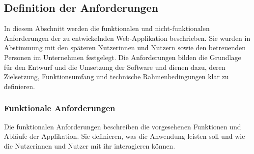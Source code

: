 \subsection{Definition der Anforderungen}
\label{sec:definition-der-anforderungen-und-ihre-interpretation}

In diesem Abschnitt werden die funktionalen und nicht-funktionalen Anforderungen der zu entwickelnden Web-Applikation beschrieben.
Sie wurden in Abstimmung mit den späteren Nutzerinnen und Nutzern sowie den betreuenden Personen im Unternehmen festgelegt.
Die Anforderungen bilden die Grundlage für den Entwurf und die Umsetzung der Software und dienen dazu, deren Zielsetzung, Funktionsumfang und technische Rahmenbedingungen klar zu definieren.


\subsubsection{Funktionale Anforderungen}\label{subsec:funktionale-anforderungen}

Die funktionalen Anforderungen beschreiben die vorgesehenen Funktionen und Abläufe der Applikation.
Sie definieren, was die Anwendung leisten soll und wie die Nutzerinnen und Nutzer mit ihr interagieren können.

